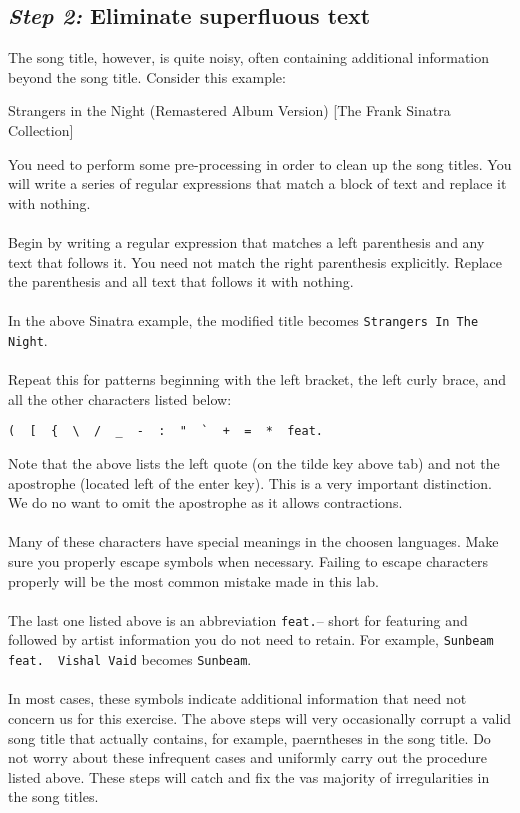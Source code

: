 \documentclass{article}
\begin{document}
\subsection*{\textit{Step 2:} Eliminate superfluous text}
The song title, however, is quite noisy, often containing additional information beyond the song title. Consider this example:
\begin{center}Strangers in the Night (Remastered Album Version) [The Frank Sinatra Collection]\end{center}

\noindent You need to perform some pre-processing in order to clean up the song titles. You will write a series of regular expressions that match a block of text and replace it with nothing.
\\\\
Begin by writing a regular expression that matches a left parenthesis and any text that follows it. You need not match the right parenthesis explicitly. Replace the parenthesis and all text that follows it with nothing.
\\\\
In the above Sinatra example, the modified title becomes \verb|Strangers In The Night|.
\\\\
Repeat this for patterns beginning with the left bracket, the left curly brace, and all the other characters listed below:
\begin{center}
 \verb|(  [  {  \  /  _  -  :  "  `  +  =  *  feat.|
\end{center}

\noindent Note that the above lists the left quote (on the tilde key above tab) and not the apostrophe (located left of the enter key). This is a very important distinction. We do no want to omit the apostrophe as it allows contractions.
\\\\
Many of these characters have special meanings in the choosen languages. Make sure you properly escape symbols when necessary. Failing to escape characters properly will be the most common mistake made in this lab.
\\\\
The last one listed above is an abbreviation \verb|feat.|-- short for featuring and followed by artist information you do not need to retain. For example, \verb|Sunbeam feat.  Vishal Vaid| becomes \verb|Sunbeam|.
\\\\
In most cases, these symbols indicate additional information that need not concern us for this exercise. The above steps will very occasionally corrupt a valid song title that actually contains, for example, paerntheses in the song title. Do not worry about these infrequent cases and uniformly carry out the procedure listed above. These steps will catch and fix the vas majority of irregularities in the song titles.
\end{document}
